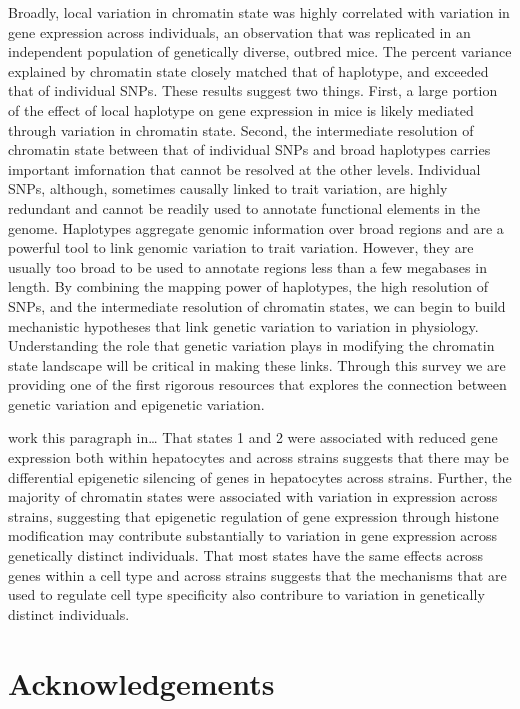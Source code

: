 \documentclass[10pt,letterpaper]{article}
\begin{document}
Broadly, local variation in chromatin state was highly correlated with
variation in gene expression across individuals, an observation that was
replicated in an independent population of genetically diverse, outbred
mice. The percent variance explained by chromatin state closely matched
that of haplotype, and exceeded that of individual SNPs. These results
suggest two things. First, a large portion of the effect of local
haplotype on gene expression in mice is likely mediated through
variation in chromatin state. Second, the intermediate resolution of
chromatin state between that of individual SNPs and broad haplotypes
carries important imfornation that cannot be resolved at the other
levels. Individual SNPs, although, sometimes causally linked to trait
variation, are highly redundant and cannot be readily used to annotate
functional elements in the genome. Haplotypes aggregate genomic
information over broad regions and are a powerful tool to link genomic
variation to trait variation. However, they are usually too broad to be
used to annotate regions less than a few megabases in length. By
combining the mapping power of haplotypes, the high resolution of SNPs,
and the intermediate resolution of chromatin states, we can begin to
build mechanistic hypotheses that link genetic variation to variation in
physiology. Understanding the role that genetic variation plays in
modifying the chromatin state landscape will be critical in making these
links. Through this survey we are providing one of the first rigorous
resources that explores the connection between genetic variation and
epigenetic variation.

work this paragraph in\ldots{} That states 1 and 2 were associated with
reduced gene expression both within hepatocytes and across strains
suggests that there may be differential epigenetic silencing of genes in
hepatocytes across strains. Further, the majority of chromatin states
were associated with variation in expression across strains, suggesting
that epigenetic regulation of gene expression through histone
modification may contribute substantially to variation in gene
expression across genetically distinct individuals. That most states
have the same effects across genes within a cell type and across strains
suggests that the mechanisms that are used to regulate cell type
specificity also contribure to variation in genetically distinct
individuals.

\hypertarget{acknowledgements}{%
\section{Acknowledgements}\label{acknowledgements}}
\end{document}

